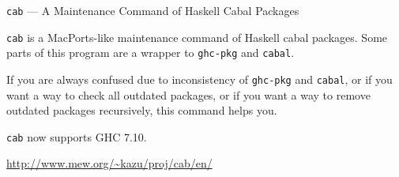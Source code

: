 \begin{hcarentry}{{\tt cab} --- A Maintenance Command of Haskell Cabal Packages}
\makeheader

{\tt cab} is a MacPorts-like maintenance command of Haskell cabal packages. Some parts of this program are a wrapper to {\tt ghc-pkg} and {\tt cabal}.

If you are always confused due to inconsistency of {\tt ghc-pkg} and {\tt cabal}, or if you want a way to check all outdated packages, or if you want a way to remove outdated packages recursively, this command helps you.

{\tt cab} now supports GHC 7.10.

\FurtherReading
  \url{http://www.mew.org/~kazu/proj/cab/en/}
\end{hcarentry}
